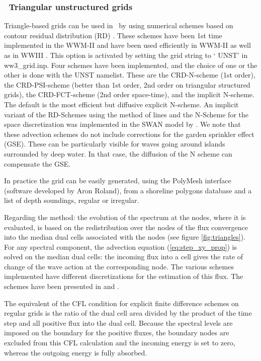 \vssub
\subsubsection{~Triangular unstructured grids} \label{sub:num_space_tri}

\noindent 
Triangle-based grids can be used in \ws\ by using numerical schemes based on
contour residual distribution (RD) \citep[see][for a review]{rep:Roland2008}.
These schemes have been 1st time implemented in the WWM-II and have been used
efficiently in WWM-II as well as in WWIII \citep[e.g.][]{art:Aea09,
art:Mea10}.  This option is activated by setting the grid string to `{\code
UNST}' in {\file ww3\_grid.inp}.  Four schemes have been implemented, and the
choice of one or the other is done with the {\code UNST} namelist.  These are
the CRD-N-scheme (1st order), the CRD-PSI-scheme (better than 1st order, 2nd
order on triangular structured grids), the CRD-FCT-scheme (2nd order
space-time), and the implicit N-scheme. The default is the most efficient but
diffusive explicit N-scheme. An implicit variant of the RD-Schemes
using the method of lines and the N-Scheme for the space discretization was
implemented in the SWAN model by \cite{art:Zij10}. We note that these advection 
schemes do not include corrections for the garden sprinkler effect (GSE). These 
can be particularly visible for waves going around islands surrounded by deep 
water. In that case, the diffusion of the N scheme can compensate the GSE.

In practice the grid can be easily generated, using the PolyMesh interface
(software developed by Aron Roland), from a shoreline polygons database
\citep[e.g.][]{art:WS96} and a list of depth soundings, regular or irregular.

Regarding the method: the evolution of the spectrum at the nodes, where it is
evaluated, is based on the redistribution over the nodes of the flux
convergence into the median dual cells associated with the nodes (see figure
\ref{fig:triangles}).  For any spectral component, the advection equation
(\ref{eq:step_xy_prop}) is solved on the median dual cells: the incoming flux
into a cell gives the rate of change of the wave action at the corresponding
node. The various schemes implemented have different discretizations for the
estimation of this flux. The schemes have been presented in \citep[see][for a
review]{rep:Roland2008} and \citet{pro:Rol12}.

The equivalent of the CFL condition for explicit finite difference schemes 
on regular grids is the ratio of the
dual cell area divided by the product of the time step and all positive flux
into the dual cell. Because the spectral levels are imposed on the boundary
for the positive fluxes, the boundary nodes are excluded from this CFL
calculation and the incoming energy is set to zero, whereas the outgoing energy 
is fully absorbed. 

